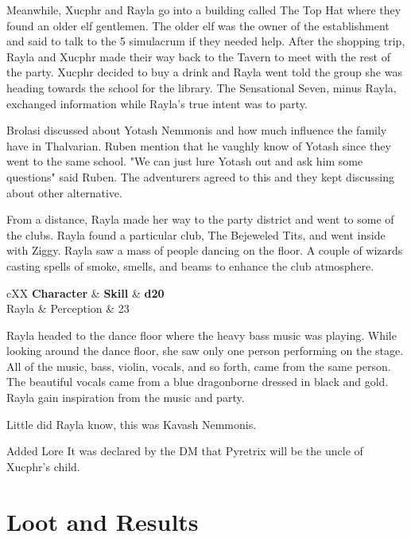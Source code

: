 Meanwhile, Xucphr and Rayla go into a building called The Top Hat where they found an older elf gentlemen.
The older elf was the owner of the establishment and said to talk to the 5 simulacrum if they needed help.
After the shopping trip, Rayla and Xucphr made their way back to the Tavern to meet with the rest of the party.
Xucphr decided to buy a drink and Rayla went told the group she was heading towards the school for the library.
The Sensational Seven, minus Rayla, exchanged information while Rayla's true intent was to party.

Brolasi discussed about Yotash Nemmonis and how much influence the family have in Thalvarian.
Ruben mention that he vaughly know of Yotash since they went to the same school.
"We can just lure Yotash out and ask him some questions" said Ruben.
The adventurers agreed to this and they kept discussing about other alternative.

From a distance, Rayla made her way to the party district and went to some of the clubs.
Rayla found a particular club, The Bejeweled Tits, and went inside with Ziggy.
Rayla saw a mass of people dancing on the floor. A couple of wizards casting spells of smoke, smells, and beams to enhance the club atmosphere.

\begin{DndTable}[color=PhbLightCyan]{cXX}
	\textbf{Character} & \textbf{Skill} & \textbf{d20} \\
	Rayla & Perception & 23\\
\end{DndTable}

Rayla headed to the dance floor where the heavy bass music was playing.
While looking around the dance floor, she saw only one person performing on the stage.
All of the music, bass, violin, vocals, and so forth, came from the same person.
The beautiful vocals came from a blue dragonborne dressed in black and gold.
Rayla gain inspiration from the music and party.

Little did Rayla know, this was Kavash Nemmonis.


\begin{DndSidebar}{Added Lore}
	It was declared by the DM that Pyretrix will be the uncle of Xucphr's child. 
\end{DndSidebar}

\section*{Loot and Results}


